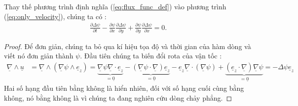 \documentclass[CO_LUU_CHAT.tex]{subfiles}
\begin{document}
Thay thế phương trình định nghĩa (\ref{eq:flux_func_def}) vào phương trình (\ref{eq:only_velocity}), chúng ta có :
\begin{equation}\label{eq:flux_func_eq}
	\begin{aligned}
		\boxed{
			\frac{{\partial \Delta \psi }}{{\partial t}} - \frac{{\partial \psi }}{{\partial x}}\frac{{\partial \Delta \psi }}{{\partial y}} + \frac{{\partial \psi }}{{\partial y}}\frac{{\partial \Delta \psi }}{{\partial x}} = 0
		}.
	\end{aligned}
\end{equation}
\begin{proof}
Để đơn giản, chúng ta bỏ qua kí hiệu tọa độ và thời gian của hàm dòng và viết nó đơn giản thành $\psi$. Đầu tiên chúng ta biến đổi rota của vận tốc :
\[
\begin{aligned}	
	\displaystyle\underline \nabla \wedge \underline u  &= \underline \nabla   \wedge \left( {\underline \nabla  \psi \wedge {{\underline e }_z}} \right) = \underbrace {\underline \nabla  \psi\underline \nabla   \cdot {{\underline e }_z}}_{ = \underline 0 } - \underbrace {\left( {\underline \nabla  \psi \cdot \underline \nabla  } \right){{\underline e }_z}}_{ = \underline 0 } - {\underline e _z}\underline \nabla   \cdot \left( {\underline \nabla  \psi} \right) + \underbrace {\left( {{{\underline e }_z} \cdot \underline \nabla  } \right)\underline \nabla  \psi }_{ = \underline 0 }=  - \Delta \psi {\underline e _z}
\end{aligned}
\]
Hai số hạng đầu tiên bằng không là hiển nhiên, đối với số hạng cuối cùng bằng không, nó bằng không là vì chúng ta đang nghiên cứu dòng chảy phẳng.


\end{proof}
\end{document}
